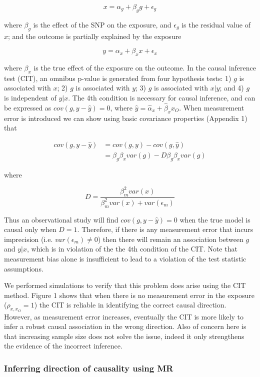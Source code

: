\documentclass[]{article}
\begin{document}
\[
x = \alpha_g + \beta_g g + \epsilon_g
\]

where \(\beta_g\) is the effect of the SNP on the exposure, and
\(\epsilon_g\) is the residual value of \(x\); and the outcome is
partially explained by the exposure

\[
y = \alpha_x + \beta_x x + \epsilon_x
\]

where \(\beta_x\) is the true effect of the exposure on the outcome. In
the causal inference test (CIT), an omnibus p-value is generated from
four hypothesis tests: 1) \(g\) is associated with \(x\); 2) \(g\) is
associated with \(y\); 3) \(g\) is associated with \(x|y\); and 4) \(g\)
is independent of \(y|x\). The 4th condition is necessary for causal
inference, and can be expressed as \(cov(g, y - \hat{y}) = 0\), where
\(\hat{y} = \hat{\alpha}_x + \hat{\beta}_x x_O\). When measurement error
is introduced we can show using basic covariance properties (Appendix 1)
that

\[
\begin{aligned}
cov(g, y - \hat{y}) & = cov(g, y) - cov(g, \hat{y})  \\
                    & = \beta_g \beta_x var(g) - D\beta_g \beta_x var(g)
\end{aligned}
\]

where

\[
D = \frac{\beta^2_m var(x)} {\beta^2_m var(x) + var(\epsilon_m)}
\]

Thus an observational study will find \(cov(g, y - \hat{y}) = 0\) when
the true model is causal only when \(D = 1\). Therefore, if there is any
measurement error that incurs imprecision (i.e.
\(var(\epsilon_m) \neq 0\)) then there will remain an association
between \(g\) and \(y|x\), which is in violation of the the 4th
condition of the CIT. Note that measurement bias alone is insufficient
to lead to a violation of the test statistic assumptions.

We performed simulations to verify that this problem does arise using
the CIT method. Figure 1 shows that when there is no measurement error
in the exposure (\(\rho_{x, x_O}=1\)) the CIT is reliable in identifying
the correct causal direction. However, as measurement error increases,
eventually the CIT is more likely to infer a robust causal association
in the wrong direction. Also of concern here is that increasing sample
size does not solve the issue, indeed it only strengthens the evidence
of the incorrect inference.

\subsubsection{Inferring direction of causality using
MR}\label{inferring-direction-of-causality-using-mr}
\end{document}
